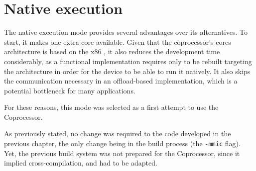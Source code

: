 \documentclass[../thesis]{subfiles}
\begin{document}
	\section{Native execution}
	\label{sec:mic:native}

	The native execution mode provides several advantages over its alternatives. To start, it makes one extra core available. Given that the coprocessor's cores architecture is based on the x86 \isa, it also reduces the development time considerably, as a \cpu functional implementation requires only to be rebuilt targeting the \mic architecture in order for the device to be able to run it natively. It also skips the communication necessary in an offload-based implementation, which is a potential bottleneck for many applications.

	For these reasons, this mode was selected as a first attempt to use the \intel\xeonphi Coprocessor.

	As previously stated, no change was required to the code developed in the previous chapter, the only change being in the build process (the \texttt{-mmic} flag). Yet, the previous build system was not prepared for the \intel\xeonphi Coprocessor, since it implied cross-compilation, and had to be adapted.

	
\end{document}
